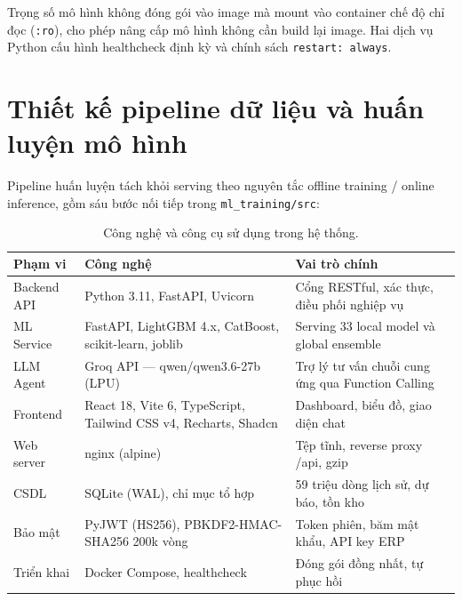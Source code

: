 \documentclass[12pt,a4paper]{report}
\begin{document}
Trọng số mô hình không đóng gói vào image mà mount vào container chế độ chỉ đọc (\texttt{:ro}), cho phép nâng cấp mô hình không cần build lại image. Hai dịch vụ Python cấu hình healthcheck định kỳ và chính sách \texttt{restart: always}.

\section{Thiết kế pipeline dữ liệu và huấn luyện mô hình}
Pipeline huấn luyện tách khỏi serving theo nguyên tắc offline training / online inference, gồm sáu bước nối tiếp trong \texttt{ml\_training/src}:

\begin{table}[H]
\centering
\small
\renewcommand{\arraystretch}{1.2}
\begin{tabularx}{\textwidth}{@{}p{2.6cm}p{5.4cm}X@{}}
\toprule
\textbf{Phạm vi} & \textbf{Công nghệ} & \textbf{Vai trò chính} \\
\midrule
Backend API & Python 3.11, FastAPI, Uvicorn & Cổng RESTful, xác thực, điều phối nghiệp vụ \\
ML Service & FastAPI, LightGBM 4.x, CatBoost, scikit-learn, joblib & Serving 33 local model và global ensemble \\
LLM Agent & Groq API --- qwen/qwen3.6-27b (LPU) & Trợ lý tư vấn chuỗi cung ứng qua Function Calling \\
Frontend & React 18, Vite 6, TypeScript, Tailwind CSS v4, Recharts, Shadcn & Dashboard, biểu đồ, giao diện chat \\
Web server & nginx (alpine) & Tệp tĩnh, reverse proxy /api, gzip \\
CSDL & SQLite (WAL), chỉ mục tổ hợp & 59 triệu dòng lịch sử, dự báo, tồn kho \\
Bảo mật & PyJWT (HS256), PBKDF2-HMAC-SHA256 200k vòng & Token phiên, băm mật khẩu, API key ERP \\
Triển khai & Docker Compose, healthcheck & Đóng gói đồng nhất, tự phục hồi \\
\bottomrule
\end{tabularx}
\caption{Công nghệ và công cụ sử dụng trong hệ thống.}
\label{tab:tech}
\end{table}
\end{document}
